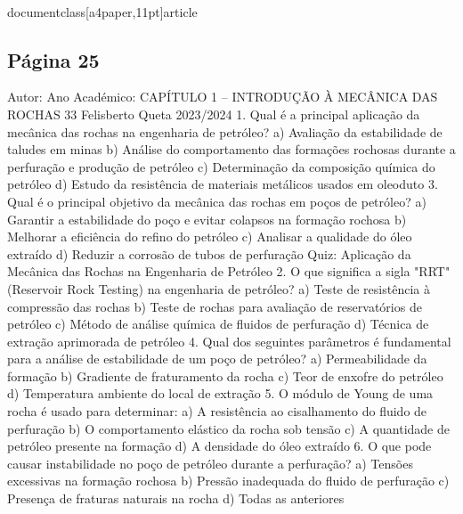 \\documentclass[a4paper,11pt]{article}
\begin{document}
\subsection*{Página 25}
Autor:
Ano Académico:
CAPÍTULO 1 – INTRODUÇÃO À MECÂNICA DAS ROCHAS
33
Felisberto Queta
2023/2024
1. Qual é a principal aplicação da mecânica das rochas na engenharia de petróleo?
a) Avaliação da estabilidade de taludes em minas
b) Análise do comportamento das formações rochosas durante a perfuração e produção de petróleo
c) Determinação da composição química do petróleo
d) Estudo da resistência de materiais metálicos usados em oleoduto
3. Qual é o principal objetivo da mecânica das rochas em poços de petróleo?
a) Garantir a estabilidade do poço e evitar colapsos na formação rochosa
b) Melhorar a eficiência do refino do petróleo
c) Analisar a qualidade do óleo extraído
d) Reduzir a corrosão de tubos de perfuração
Quiz: Aplicação da 
Mecânica das 
Rochas na 
Engenharia de 
Petróleo
2. O que significa a sigla "RRT" (Reservoir Rock Testing) na engenharia de petróleo?
a) Teste de resistência à compressão das rochas
b) Teste de rochas para avaliação de reservatórios de petróleo
c) Método de análise química de fluidos de perfuração
d) Técnica de extração aprimorada de petróleo
4. Qual dos seguintes parâmetros é fundamental para a análise de estabilidade de um poço de petróleo?
a) Permeabilidade da formação
b) Gradiente de fraturamento da rocha
c) Teor de enxofre do petróleo
d) Temperatura ambiente do local de extração
5. O módulo de Young de uma rocha é usado para determinar:
a) A resistência ao cisalhamento do fluido de perfuração
b) O comportamento elástico da rocha sob tensão
c) A quantidade de petróleo presente na formação
d) A densidade do óleo extraído
6. O que pode causar instabilidade no poço de petróleo durante a perfuração?
a) Tensões excessivas na formação rochosa
b) Pressão inadequada do fluido de perfuração
c) Presença de fraturas naturais na rocha
d) Todas as anteriores
\end{document}

